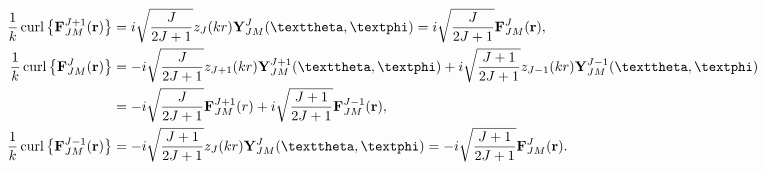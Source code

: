 \begin{enumerate}[label=(\alph*)]
\begin{equation}
\begin{aligned}
\frac{1}{k} \curl \left\{\vect{F}_{J M}^{J+1}(\vect{r})\right\} & =i \sqrt{\frac{J}{2 J+1}} z_{J}(k r) \vect{Y}_{J M}^{J}(\vartheta, \varphi)=i \sqrt{\frac{J}{2 J+1}} \vect{F}_{J M}^{J}(\vect{r}), \\
\frac{1}{k} \curl \left\{\vect{F}_{J M}^{J}(\vect{r})\right\} & =-i \sqrt{\frac{J}{2 J+1}} z_{J+1}(k r) \vect{Y}_{J M}^{J+1}(\vartheta, \varphi)+i \sqrt{\frac{J+1}{2 J+1}} z_{J-1}(k r) \vect{Y}_{J M}^{J-1}(\vartheta, \varphi) \\
& =-i \sqrt{\frac{J}{2 J+1}} \vect{F}_{J M}^{J+1}(r)+i \sqrt{\frac{J+1}{2 J+1}} \vect{F}_{J M}^{J-1}(\vect{r}) ,\\
\frac{1}{k} \curl \left\{\vect{F}_{J M}^{J-1}(\vect{r})\right\} & =-i \sqrt{\frac{J+1}{2 J+1}} z_{J}(k r) \vect{Y}_{J M}^{J}(\vartheta, \varphi)=-i \sqrt{\frac{J+1}{2 J+1}} \vect{F}_{J M}^{J}(\vect{r}).
\end{aligned} \label{eq:7:3:60}
\end{equation}
\end{enumerate}

